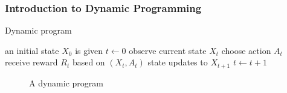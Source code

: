 \begin{frame}
    \frametitle{Introduction to Dynamic Programming}

    Dynamic program

    \begin{algorithm}[H]
      \DontPrintSemicolon
      an initial state $X_0$ is given \;
      $t \leftarrow 0$ \; %
      {
          observe current state $X_t$   \;
          choose action $A_t$ \;
          receive reward $R_t$ based on $(X_t, A_t)$ \;
          state updates to $X_{t+1}$ \;
          $t \leftarrow t + 1$ \;
      }
    \end{algorithm}

\end{frame}

\begin{frame}
    
    \begin{figure}
        \centering
        \vspace{1em}
        \scalebox{0.4}{}
        \vspace{1em}
        \caption{\label{f:state_action_reward} A dynamic program}
    \end{figure}

\end{frame}


